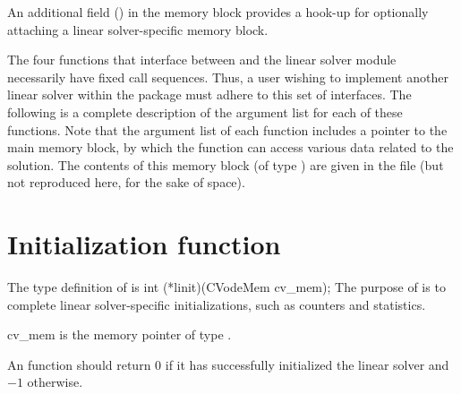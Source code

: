 An additional field () in the {\cvodes} memory block
provides a hook-up for optionally attaching a linear solver-specific
memory block.

The four functions that interface between {\cvodes} and the linear solver module
necessarily have fixed call sequences.  Thus, a user wishing to implement another 
linear solver within the {\cvodes} package must adhere to this set of interfaces.
The following is a complete description of the argument list for each of
these functions.  Note that the argument list of each function includes a
pointer to the main {\cvodes} memory block, by which the function can access
various data related to the {\cvodes} solution.  The contents of this memory
block (of type ) are given in the file  
(but not reproduced here, for the sake of space).


\section{Initialization function}
The type definition of  is
{
  int (*linit)(CVodeMem cv\_mem);
}
{
  The purpose of  is to complete linear solver-specific initializations,
  such as counters and statistics.        
}
{
  \begin{args}[cv\_mem]
  \item[cv\_mem]
    is the {\cvodes} memory pointer of type .
  \end{args}
}
{
  An  function should return $0$ if it 
  has successfully initialized the {\cvodes} linear solver and 
  $-1$ otherwise. 
}
{}


